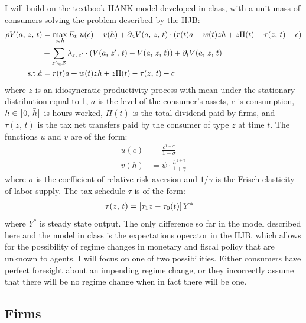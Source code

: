 \documentclass[11pt]{article}
\begin{document}
I will build on the textbook HANK model developed in class, with a unit mass of consumers solving the problem described by the HJB:
\begin{align*}
    \rho V(a,\,z,\,t) &= \max_{c,\,h} E_t\,\, u(c) - v(h) + \partial_{a}V(a,\,z,\,t)\cdot \bp{r(t)a + w(t)zh + z\Pi(t) - \tau(z,\,t) - c} \\&+ \sum_{z' \in \mathcal{Z}} \l_{z,\,z'} \cdot (V(a,\,z',\,t) - V(a,\,z,\,t)) + \partial_{t}V(a,\,z,\,t)\\
    \text{s.t.} \dot{a} &= r(t)a + w(t)zh + z\Pi(t) - \tau(z,\,t) - c
\end{align*}
where $z$ is an idiosyncratic productivity process with mean under the stationary distribution equal to 1, $a$ is the level of the consumer's assets, $c$ is consumption, $h \in \left[ 0,\,\bar{h} \right]$ is hours worked, $\Pi(t)$ is the total dividend paid by firms, and $\tau(z,\,t)$ is the tax net transfers paid by the consumer of type $z$ at time $t$. The functions $u$ and $v$ are of the form:
\begin{align*}
    u(c) &= \frac{c^{1-\sigma}}{1 - \sigma} \\
    v(h) &= \psi \cdot \frac{h^{1+\gamma}}{1 + \gamma}
\end{align*}
where $\sigma$ is the coefficient of relative risk aversion and $1/\gamma$ is the Frisch elasticity of labor supply. The tax schedule $\tau$ is of the form:
\begin{align}
    \tau(z,\,t) &= \left[ \tau_1z - \tau_0(t) \right]Y^*
\end{align}
where $Y^*$ is steady state output. The only difference so far in the model described here and the model in class is the expectations operator in the HJB, which allows for the possibility of regime changes in monetary and fiscal policy that are unknown to agents. I will focus on one of two possibilities. Either consumers have perfect foresight about an impending regime change, or they incorrectly assume that there will be no regime change when in fact there will be one.

\subsection{Firms}
\end{document}

